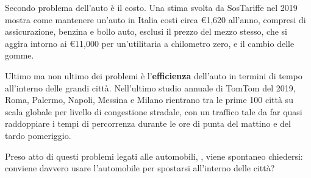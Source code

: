 Secondo problema dell'auto è il costo. Una stima svolta da SosTariffe nel 2019 mostra come mantenere un'auto in Italia costi circa €1,620 all'anno, compresi di assicurazione, benzina e bollo auto, esclusi il prezzo del mezzo stesso, che si aggira intorno ai €11,000 per un'utilitaria a chilometro zero, e il cambio delle gomme\cite{sostariffe}.

Ultimo ma non ultimo dei problemi è l'\textbf{efficienza} dell'auto in termini di tempo all'interno delle grandi città. Nell'ultimo studio annuale di TomTom del 2019\cite{tomtomindexmilan}, Roma, Palermo, Napoli, Messina e Milano rientrano tra le prime 100 città su scala globale per livello di congestione stradale, con un traffico tale da far quasi raddoppiare i tempi di percorrenza durante le ore di punta del mattino e del tardo pomeriggio.

Preso atto di questi problemi legati alle automobili, , viene spontaneo chiedersi: conviene davvero usare l'automobile per spostarsi all'interno delle città?
